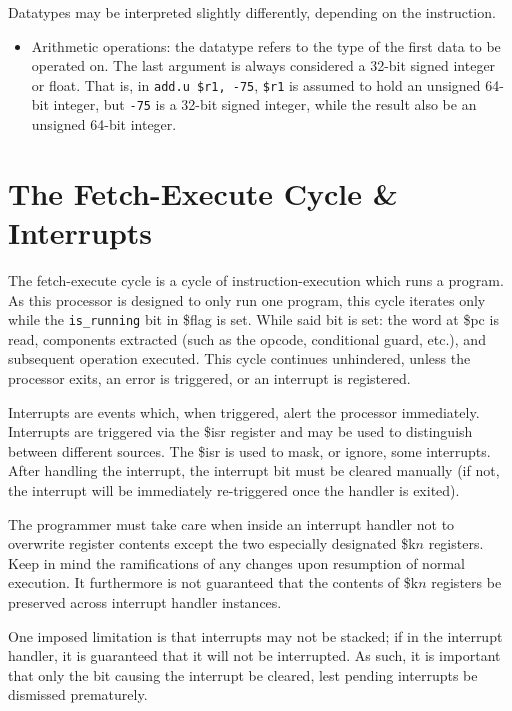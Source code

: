\documentclass[10pt]{article}
\begin{document}
    \bigskip
    Datatypes may be interpreted slightly differently, depending on the instruction.

    \begin{itemize}
        \item Arithmetic operations: the datatype refers to the type of the first data to be operated on.
        The last argument is always considered a 32-bit signed integer or float.
        That is, in \texttt{add.u \$r1, -75}, \texttt{\$r1} is assumed to hold an unsigned 64-bit integer, but \texttt{-75} is a 32-bit signed integer, while the result also be an unsigned 64-bit integer.

    \end{itemize}

    \section{The Fetch-Execute Cycle \& Interrupts}\label{sec:interrupts}

    The fetch-execute cycle is a cycle of instruction-execution which runs a program.
    As this processor is designed to only run one program, this cycle iterates only while the \texttt{is\_running} bit in \$flag is set.
    While said bit is set: the word at \$pc is read, components extracted (such as the opcode, conditional guard, etc.), and subsequent operation executed.
    This cycle continues unhindered, unless the processor exits, an error is triggered, or an interrupt is registered.

    Interrupts are events which, when triggered, alert the processor immediately.
    Interrupts are triggered via the \$isr register and may be used to distinguish between different sources.
    The \$isr is used to mask, or ignore, some interrupts.
    After handling the interrupt, the interrupt bit must be cleared manually (if not, the interrupt will be immediately re-triggered once the handler is exited).

    The programmer must take care when inside an interrupt handler not to overwrite register contents except the two especially designated \$k$n$ registers.
    Keep in mind the ramifications of any changes upon resumption of normal execution.
    It furthermore is not guaranteed that the contents of \$k$n$ registers be preserved across interrupt handler instances.

    One imposed limitation is that interrupts may not be stacked; if in the interrupt handler, it is guaranteed that it will not be interrupted.
    As such, it is important that only the bit causing the interrupt be cleared, lest pending interrupts be dismissed prematurely.
\end{document}
